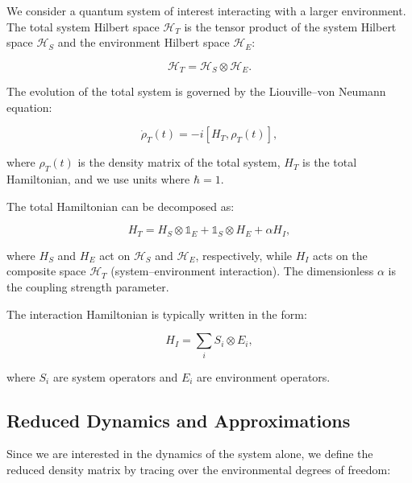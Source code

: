 \noindent
We consider a quantum system of interest interacting with a larger environment. The total system Hilbert space $\mathcal{H}_T$ is the tensor product of the system Hilbert space $\mathcal{H}_S$ and the environment Hilbert space $\mathcal{H}_E$:

\begin{equation}
	\mathcal{H}_T = \mathcal{H}_S \otimes \mathcal{H}_E.
	\label{eq:Total_Hilbert_Space}
\end{equation}

\noindent
The evolution of the total system is governed by the Liouville–von Neumann equation:

\begin{equation}
	\dot{\rho}_T(t) = -i[H_T, \rho_T(t)],
	\label{eq:Von_Neumann_Equation}
\end{equation}

\noindent
where $\rho_T(t)$ is the density matrix of the total system, $H_T$ is the total Hamiltonian, and we use units where $\hbar = 1$.

\noindent
The total Hamiltonian can be decomposed as:

\begin{equation}
	H_T = H_S \otimes \mathds{1}_E + \mathds{1}_S \otimes H_E + \alpha H_I,
	\label{eq:Total_Hamiltonian}
\end{equation}

\noindent
where $H_S$ and $H_E$ act on $\mathcal{H}_S$ and $\mathcal{H}_E$, respectively, while $H_I$ acts on the composite space $\mathcal{H}_T$ (system--environment interaction). The dimensionless $\alpha$ is the coupling strength parameter.

\noindent The interaction Hamiltonian is typically written in the form:

\begin{equation}
	H_I = \sum_i S_i \otimes E_i,
	\label{eq:Interaction_Hamiltonian}
\end{equation}

\noindent
where $S_i$ are system operators and $E_i$ are environment operators.

\subsection{Reduced Dynamics and Approximations}

\noindent
Since we are interested in the dynamics of the system alone, we define the reduced density matrix by tracing over the environmental degrees of freedom:

